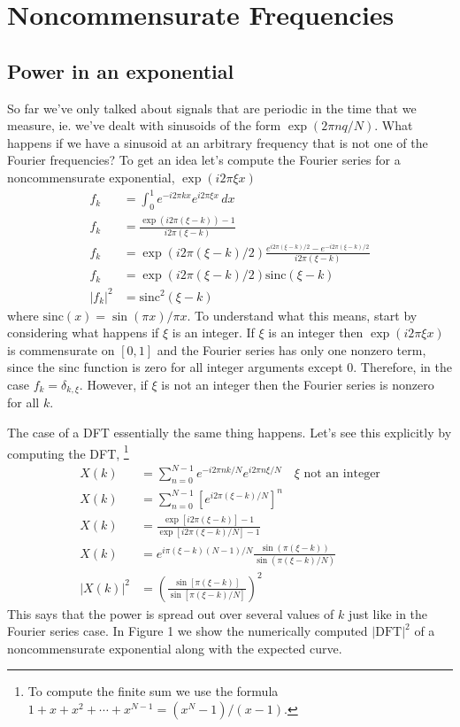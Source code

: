 \section{Noncommensurate Frequencies}


\subsection{Power in an exponential}

So far we've only talked about signals that are periodic in the time that we measure, ie. we've dealt with sinusoids of the form $\exp\left(2\pi nq/N\right)$. What happens if we have a sinusoid at an arbitrary frequency that is not one of the Fourier frequencies? To get an idea let's compute the Fourier series for a noncommensurate exponential, $\exp\left(i2\pi\xi x\right)$
\begin{align*}
f_{k} & = \int_{0}^{1}e^{-i2\pi kx}e^{i2\pi\xi x}\, dx\\
f_{k} & = \frac{\exp\left(i2\pi(\xi-k)\right)-1}{i2\pi(\xi-k)}\\
f_{k} & = \exp\left(i2\pi(\xi-k)/2\right)\frac{e^{i2\pi(\xi-k)/2}-e^{-i2\pi(\xi-k)/2}}{i2\pi(\xi-k)}\\
f_{k} & = \exp\left(i2\pi(\xi-k)/2\right)\textrm{sinc}\left(\xi-k\right)\\
|f_{k}|^{2} & = \textrm{sinc}^{2}\left(\xi-k\right)
\end{align*}
where $\textrm{sinc}(x)=\sin\left(\pi x\right)/\pi x$. To understand what this means, start by considering what happens if $\xi$ is an integer. If $\xi$ is an integer then $\exp\left(i2\pi\xi x\right)$ is commensurate on $[0,1]$ and the Fourier series has only one nonzero term, since the sinc function is zero for all integer arguments except 0. Therefore, in the case $f_{k}=\delta_{k,\xi}$. However, if $\xi$ is not an integer then the Fourier series is nonzero for all $k$.

The case of a DFT essentially the same thing happens. Let's see this explicitly by computing the DFT, \footnote{To compute the finite sum we use the formula $1+x+x^{2}+\cdots+x^{N-1}=(x^{N}-1)/(x-1)$.}
\begin{align*}
X(k) & = \sum_{n=0}^{N-1}e^{-i2\pi nk/N}e^{i2\pi n\xi/N}\quad\xi\textrm{ not an integer}\\
X(k) & = \sum_{n=0}^{N-1}\left[e^{i2\pi(\xi-k)/N}\right]^{n}\\
X(k) & = \frac{\exp\left[i2\pi\left(\xi-k\right)\right]-1}{\exp\left[i2\pi\left(\xi-k\right)/N\right]-1}\\
X(k) & = e^{i\pi(\xi-k)(N-1)/N}\frac{\sin\left(\pi\left(\xi-k\right)\right)}{\sin\left(\pi\left(\xi-k\right)/N\right)}\\
|X(k)|^{2} & = \left(\frac{\sin\left[\pi\left(\xi-k\right)\right]}{\sin\left[\pi\left(\xi-k\right)/N\right]}\right)^{2}
\end{align*}
This says that the power is spread out over several values of $k$ just like in the Fourier series case. In Figure 1 we show the numerically computed $|\textrm{DFT}|^2$ of a noncommensurate exponential along with the expected curve.


